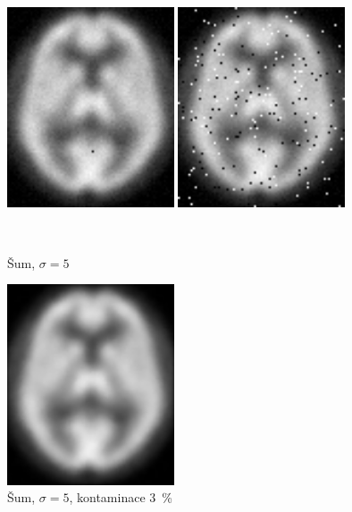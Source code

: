     \begin{figure}[h!]
        \begin{minipage}[l]{0.5\textwidth}
            \center
            \includegraphics[width = 140pt]{src/8Appendix/final/5-30noise.png}
        \end{minipage}
        \begin{minipage}[r]{0.5\textwidth}
            \center
            \includegraphics[width = 140pt]{src/8Appendix/final/5-30contaminated.png}
        \end{minipage}
        \\
        \begin{minipage}[l]{0.5\textwidth}
            \caption{Šum, $\sigma = 5$}
        \end{minipage}
        \begin{minipage}[r]{0.5\textwidth}
            \caption{Šum, $\sigma = 5$, kontaminace 3~\%}
        \end{minipage}
        \begin{minipage}[l]{0.5\textwidth}
            \center
            \includegraphics[width = 140pt]{src/8Appendix/final/5-30bes.png}

\end{minipage}
\end{figure}

